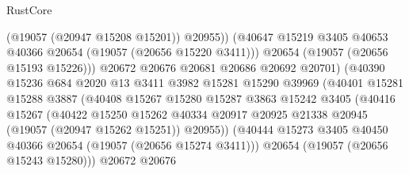 \begin{lexlean}{RustCore}
\begin{coremodule}
                                    (@19057 (@20947 @15208 @15201))
                                    @20955))
                                (@40647
                                  @15219
                                  @3405
                                  @40653
                                  @40366
                                  @20654
                                  (@19057 (@20656 @15220 @3411)))
                                @20654
                                (@19057 (@20656 @15193 @15226)))
                              @20672
                              @20676
                              @20681
                              @20686
                              @20692
                              @20701)
                            (@40390
                              @15236
                              @684
                              @2020
                              @13
                              @3411
                              @3982
                              @15281
                              @15290
                              @39969
                              (@40401
                                @15281
                                @15288
                                @3887
                                (@40408
                                  @15267
                                  @15280
                                  @15287
                                  @3863
                                  @15242
                                  @3405
                                  (@40416
                                    @15267
                                    (@40422
                                      @15250
                                      @15262
                                      @40334
                                      @20917
                                      @20925
                                      @21338
                                      @20945
                                      (@19057 (@20947 @15262 @15251))
                                      @20955))
                                  (@40444
                                    @15273
                                    @3405
                                    @40450
                                    @40366
                                    @20654
                                    (@19057 (@20656 @15274 @3411)))
                                  @20654
                                  (@19057 (@20656 @15243 @15280)))
                                @20672
                                @20676

\end{coremodule}
\end{lexlean}
